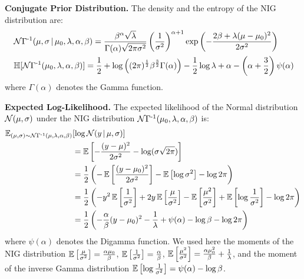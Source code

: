 \textbf{Conjugate Prior Distribution.} The density and the entropy of the NIG distribution are:
%
\begin{align}\label{eq:density-entropy-nig}
    &\operatorname{\mathcal{N}\Gamma^{-1}}(\mu, \sigma \,|\, \mu_0, \lambda, \alpha, \beta) = \frac{\beta^\alpha \sqrt{\lambda}}{\Gamma(\alpha) \sqrt{2\pi\sigma^2}} \left(\frac{1}{\sigma^2}\right)^{\alpha+1} \exp\left( - \frac{2\beta + \lambda (\mu - \mu_0)^2}{2 \sigma^2}\right)\\
    &\operatorname{\mathbb{H}}[\operatorname{\mathcal{N}\Gamma^{-1}}(\mu_0, \lambda, \alpha, \beta)] = \frac{1}{2} + \log\left((2\pi)^{\frac{1}{2}}\beta^{\frac{3}{2}}\Gamma(\alpha)\right) - \frac{1}{2} \log{\lambda} + \alpha - \left(\alpha+\frac{3}{2}\right)\psi(\alpha)
\end{align}
%
where $\Gamma(\alpha)$ denotes the Gamma function.

\textbf{Expected Log-Likelihood.} The expected likelihood of the Normal distribution $\operatorname{\mathcal{N}}(\mu, \sigma)$ under the NIG distribution $\operatorname{\mathcal{N}\Gamma^{-1}}(\mu_0, \lambda, \alpha, \beta)$ is:
%
\begin{align}\label{eq:expected-likelihood-normal-nig}
\operatorname{\mathbb{E}}_{(\mu, \sigma) \sim \operatorname{\mathcal{N}\Gamma^{-1}}(\mu, \lambda, \alpha, \beta)}&[\log \operatorname{\mathcal{N}}(y \,|\, \mu, \sigma)] \\
&= \operatorname{\mathbb{E}}\left[-\frac{(y-\mu)^2}{2\sigma^2} - \log(\sigma\sqrt{2\pi}) \right]\\
&= \frac{1}{2}\left(-\operatorname{\mathbb{E}}\left[ \frac{(y-\mu_0)^2}{2\sigma^2} \right] - \operatorname{\mathbb{E}}\left[ \log\sigma^2 \right] - \log2\pi \right)\\
&= \frac{1}{2}\left(-y^2\operatorname{\mathbb{E}}\left[ \frac{1}{\sigma^2} \right] + 2 y \operatorname{\mathbb{E}}\left[\frac{\mu}{\sigma^2}\right] - \operatorname{\mathbb{E}}\left[ \frac{\mu^2}{\sigma^2} \right] + \operatorname{\mathbb{E}}\left[ \log\frac{1}{\sigma^2} \right] - \log2\pi \right)\\
&= \frac{1}{2}\left(- \frac{\alpha}{\beta} (y - \mu_0)^2 - \frac{1}{\lambda} + \psi(\alpha) - \log{\beta} - \log{2\pi}\right)
\end{align}
%
where $\psi(\alpha)$ denotes the Digamma function. We used here the moments of the NIG distribution $\operatorname{\mathbb{E}}\left[\frac{\mu}{\sigma^2}\right]=\frac{\alpha \mu_0}{\beta}$, $\operatorname{\mathbb{E}}\left[\frac{1}{\sigma^2}\right]=\frac{\alpha}{\beta}$, $\operatorname{\mathbb{E}}\left[\frac{\mu^2}{\sigma^2}\right]=\frac{\alpha \mu_0^2}{\beta} + \frac{1}{\lambda}$, and the moment of the inverse Gamma distribution $\operatorname{\mathbb{E}}\left[\log{\frac{1}{\sigma^2}}\right]=\psi(\alpha) - \log{\beta}$.


